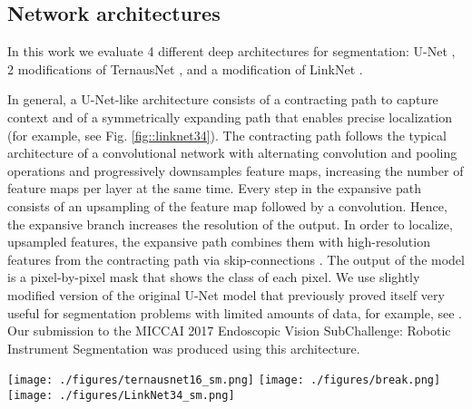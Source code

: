 \documentclass[runningheads,a4paper]{llncs}[2015/06/24]
\begin{document}
\subsection{Network architectures}
In this work we evaluate 4 different deep architectures for segmentation: U-Net \cite{ronneberger2015u, iglovikov2017satellite}, 2 modifications of TernausNet \cite{iglovikov2018ternausnet}, and a modification of LinkNet \cite{chaurasia2017linknet}.

In general, a U-Net-like architecture consists of a contracting path to capture context and of a symmetrically expanding path that enables precise localization (for example, see Fig. \ref{fig::linknet34}). The contracting path follows the typical architecture of a convolutional network with alternating convolution and pooling operations and progressively downsamples feature maps, increasing the number of feature maps per layer at the same time. Every step in the expansive path consists of an upsampling of the feature map followed by a convolution. Hence, the expansive branch increases the resolution of the output. In order to localize, upsampled features, the expansive path combines them with high-resolution features from the contracting path via skip-connections \cite{ronneberger2015u}. The output of the model is a pixel-by-pixel mask that shows the class of each pixel. We use slightly modified version of the original U-Net model that previously proved itself very useful for segmentation problems with limited amounts of data, for example, see \cite{iglovikov2017satellite, iglovikov2017pediatric}. Our submission to the MICCAI 2017 Endoscopic Vision SubChallenge: Robotic Instrument Segmentation \cite{miccai2017} was produced using this architecture.

\begin{figure*}[!b]
\texttt{[image: ./figures/ternausnet16\_sm.png]}
\texttt{[image: ./figures/break.png]}
\texttt{[image: ./figures/LinkNet34\_sm.png]}
\caption{These segmentation networks are based on encoder-decoder network of U-Net family. TernausNet uses pre-trained VGG16 network as an encoder, while LinkNet-34 uses pre-trained ResNet34. Each box corresponds to a multi-channel feature map. The number of channels is pointed below the box. The height of the box represents a feature map resolution. The blue arrows denote skip-connections where information is transmitted from the encoder to the decoder.}
\label{fig::linknet34}
\end{figure*}
\end{document}

